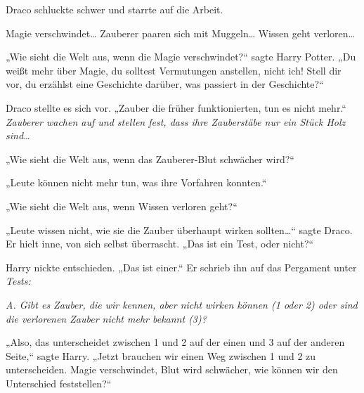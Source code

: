 Draco schluckte schwer und starrte auf die Arbeit.

Magie verschwindet… Zauberer paaren sich mit Muggeln… Wissen geht verloren…

„Wie sieht die Welt aus, wenn die Magie verschwindet?“ sagte Harry Potter. „Du weißt mehr über Magie, du solltest Vermutungen anstellen, nicht ich! Stell dir vor, du erzählst eine Geschichte darüber, was passiert in der Geschichte?“

Draco stellte es sich vor. „Zauber die früher funktionierten, tun es nicht mehr.“ \emph{Zauberer wachen auf und stellen fest, dass ihre Zauberstäbe nur ein Stück Holz sind…}

„Wie sieht die Welt aus, wenn das Zauberer-Blut schwächer wird?“

„Leute können nicht mehr tun, was ihre Vorfahren konnten.“

„Wie sieht die Welt aus, wenn Wissen verloren geht?“

„Leute wissen nicht, wie sie die Zauber überhaupt wirken sollten…“ sagte Draco. Er hielt inne, von sich selbst überrascht. „Das ist ein Test, oder nicht?“

Harry nickte entschieden. „Das ist einer.“ Er schrieb ihn auf das Pergament unter \emph{Tests:}

\emph{A. Gibt es Zauber, die wir kennen, aber nicht wirken können (1 oder 2) oder sind die verlorenen Zauber nicht mehr bekannt (3)?}

„Also, das unterscheidet zwischen 1 und 2 auf der einen und 3 auf der anderen Seite,“ sagte Harry. „Jetzt brauchen wir einen Weg zwischen 1 und 2 zu unterscheiden. Magie verschwindet, Blut wird schwächer, wie können wir den Unterschied feststellen?“


